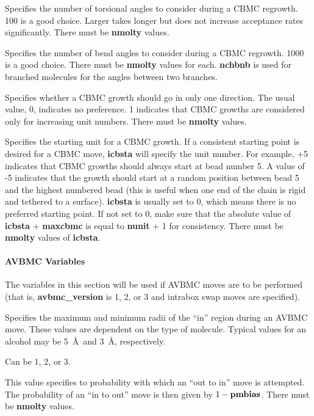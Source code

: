 \documentclass[12pt,letterpaper]{article}
\begin{document}
 Specifies the number of torsional
angles to consider during a CBMC regrowth. 100 is a good
choice. Larger takes longer but does not increase acceptance
rates significantly. There must be {\bf nmolty} values.

 Specifies the number of bend
angles to consider during a CBMC regrowth. 1000 is a good
choice. There must be \textbf{nmolty} values for each. {\bf
  nchbnb} is used for branched molecules for the angles
between two branches.

 Specifies whether a CBMC growth
should go in only one direction. The usual value, 0,
indicates no preference. 1 indicates that CBMC growths are
considered only for increasing unit numbers. There must be
{\bf nmolty} values.

 Specifies the starting unit for a
CBMC growth. If a consistent starting point is desired for a
CBMC move, {\bf icbsta} will specify the unit number. For
example, +5 indicates that CBMC growths should always start
at bead number 5. A value of -5 indicates that the growth
should start at a random position between bead 5 and the
highest numbered bead (this is useful when one end of the
chain is rigid and tethered to a surface). {\bf icbsta} is
usually set to 0, which means there is no preferred starting
point. If not set to 0, make sure that the absolute value of
{\bf icbsta} + {\bf maxcbmc} is equal to {\bf nunit} + 1 for
consistency. There must be {\bf nmolty} values of {\bf
  icbsta}.

\paragraph{AVBMC Variables}
\label{avbmc_vars}

The variables in this section will be used if AVBMC moves
are to be performed (that is, {\bf avbmc\_version} is 1, 2,
or 3 and intrabox swap moves are specified).

 Specifies the maximum and
minimum radii of the ``in'' region during an AVBMC move.
These values are dependent on the type of molecule. Typical
values for an alcohol may be 5~\AA~and 3~\AA, respectively.

 Can be 1, 2, or 3.

 This value specifies to probability
with which an ``out to in'' move is attempted. The
probability of an ``in to out'' move is then given by $1 -
{\bf pmbias}$. There must be {\bf nmolty} values.
\end{document}
